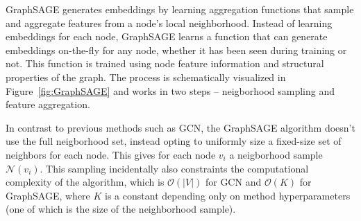 GraphSAGE generates embeddings by learning aggregation functions that sample and aggregate features from a node’s local neighborhood. Instead of learning embeddings for each node, GraphSAGE learns a function that can generate embeddings on-the-fly for any node, whether it has been seen during training or not. This function is trained using node feature information and structural properties of the graph. The process is schematically visualized in Figure~\ref{fig:GraphSAGE} and works in two steps -- neigborhood sampling and feature aggregation.

In contrast to previous methods such as GCN, the GraphSAGE algorithm doesn't use the full neigborhood set, instead opting to uniformly size a fixed-size set of neighbors for each node. This gives for each node \( v_i \) a neigborhood sample \( \mathcal{N} \left( v_i \right) \). This sampling incidentally also constraints the computational complexity of the algorithm, which is \( \mathcal{O} \left( \left\lvert V \right\rvert \right) \) for GCN and \( \mathcal{O} \left( K \right) \) for GraphSAGE, where \( K \) is a constant depending only on method hyperparameters (one of which is the size of the neighborhood sample).

